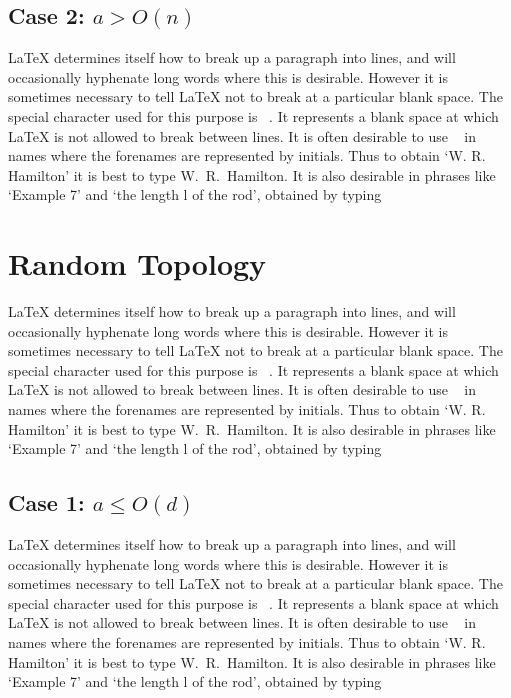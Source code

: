 \documentclass[12pt]{report}
\begin{document}
\subsection{Case 2: $a > O(n)$}

LaTeX determines itself how to break up a paragraph into lines, and will occasionally hyphenate long words where this is desirable. However it is sometimes necessary to tell LaTeX not to break at a particular blank space. The special character used for this purpose is ~. It represents a blank space at which LaTeX is not allowed to break between lines. It is often desirable to use ~ in names where the forenames are represented by initials. Thus to obtain `W. R. Hamilton' it is best to type W.~R.~Hamilton. It is also desirable in phrases like `Example 7' and `the length l of the rod', obtained by typing



\section{Random Topology}

LaTeX determines itself how to break up a paragraph into lines, and will occasionally hyphenate long words where this is desirable. However it is sometimes necessary to tell LaTeX not to break at a particular blank space. The special character used for this purpose is ~. It represents a blank space at which LaTeX is not allowed to break between lines. It is often desirable to use ~ in names where the forenames are represented by initials. Thus to obtain `W. R. Hamilton' it is best to type W.~R.~Hamilton. It is also desirable in phrases like `Example 7' and `the length l of the rod', obtained by typing



\subsection{Case 1: $a \le O(d)$}

LaTeX determines itself how to break up a paragraph into lines, and will occasionally hyphenate long words where this is desirable. However it is sometimes necessary to tell LaTeX not to break at a particular blank space. The special character used for this purpose is ~. It represents a blank space at which LaTeX is not allowed to break between lines. It is often desirable to use ~ in names where the forenames are represented by initials. Thus to obtain `W. R. Hamilton' it is best to type W.~R.~Hamilton. It is also desirable in phrases like `Example 7' and `the length l of the rod', obtained by typing
\end{document}
